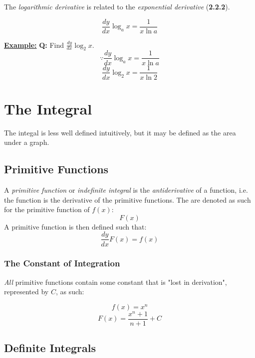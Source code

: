 \documentclass[12pt]{article}
\begin{document}
The \emph{logarithmic derivative} is related to the \emph{exponential derivative} (\textbf{2.2.2}). 

$$\frac{dy}{dx} \log_{a}x = \frac{1}{x \ln{a}}$$

\begin{BOX}

	\textbf{\underline{Example:}} \bigbreak
	\textbf{Q:} Find $\frac{dy}{dx}\log_2x$. \bigbreak
	$$\because \frac{dy}{dx}\log_ax = \frac{1}{x \ln{a}}$$
	$$\frac{dy}{dx} \log_2x = \frac{1}{x \ln{2}}$$


\end{BOX}
\newpage

\section{The Integral}

The integal is less well defined intuitively, but it may be defined as the area under a graph.

\subsection{Primitive Functions}

A \emph{primitive function} or \emph{indefinite integral} is the \emph{antiderivative} of a function, i.e. the function is the derivative of the primitive functions. The are denoted as such for
 the primitive function of $f(x)$: 
$$F(x)$$
\bigbreak
A primitive function is then defined such that: 
$$\frac{dy}{dx}F(x)=f(x)$$

\subsubsection{The Constant of Integration}

\emph{All} primitive functions contain some constant that is "lost in derivation", represented by $C$, as such:

$$f(x) = x^n$$
$$F(x) = \frac{x^n+1}{n+1} + C$$

\newpage

\subsection{Definite Integrals}
\end{document}
